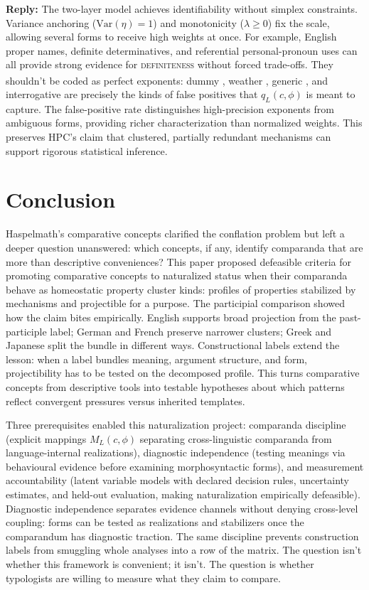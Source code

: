 \documentclass[12pt]{article}
\begin{document}
\textbf{Reply:} The two-layer model achieves identifiability without simplex constraints. Variance anchoring ($\text{Var}(\eta)=1$) and monotonicity ($\lambda \geq 0$) fix the scale, allowing several forms to receive high weights at once. For example, English proper names, definite determinatives, and referential personal-pronoun uses can all provide strong evidence for \textsc{definiteness}\textsubscript{\Cross} without forced trade-offs. They shouldn't be coded as perfect exponents: dummy , weather , generic , and interrogative  are precisely the kinds of false positives that $q_L(c,\phi)$ is meant to capture. The false-positive rate distinguishes high-precision exponents from ambiguous forms, providing richer characterization than normalized weights. This preserves HPC's claim that clustered, partially redundant mechanisms can support rigorous statistical inference.

\section{Conclusion}\label{sec:conclusion}

Haspelmath's comparative concepts clarified the conflation problem but left a deeper question unanswered: which concepts, if any, identify comparanda that are more than descriptive conveniences? This paper proposed defeasible criteria for promoting comparative concepts to naturalized status when their comparanda behave as homeostatic property cluster kinds: profiles of properties stabilized by mechanisms and projectible for a purpose. The participial comparison showed how the claim bites empirically. English supports broad projection from the past-participle label; German and French preserve narrower clusters; Greek and Japanese split the bundle in different ways. Constructional labels extend the lesson: when a label bundles meaning, argument structure, and form, projectibility has to be tested on the decomposed profile. This turns comparative concepts from descriptive tools into testable hypotheses about which patterns reflect convergent pressures versus inherited templates.

Three prerequisites enabled this naturalization project: comparanda discipline (explicit mappings $M_L(c,\phi)$ separating cross-linguistic comparanda from language-internal realizations), diagnostic independence (testing meanings via behavioural evidence before examining morphosyntactic forms), and measurement accountability (latent variable models with declared decision rules, uncertainty estimates, and held-out evaluation, making naturalization empirically defeasible). Diagnostic independence separates evidence channels without denying cross-level coupling: forms can be tested as realizations and stabilizers once the comparandum has diagnostic traction. The same discipline prevents construction labels from smuggling whole analyses into a row of the matrix. The question isn't whether this framework is convenient; it isn't. The question is whether typologists are willing to measure what they claim to compare.
\end{document}

